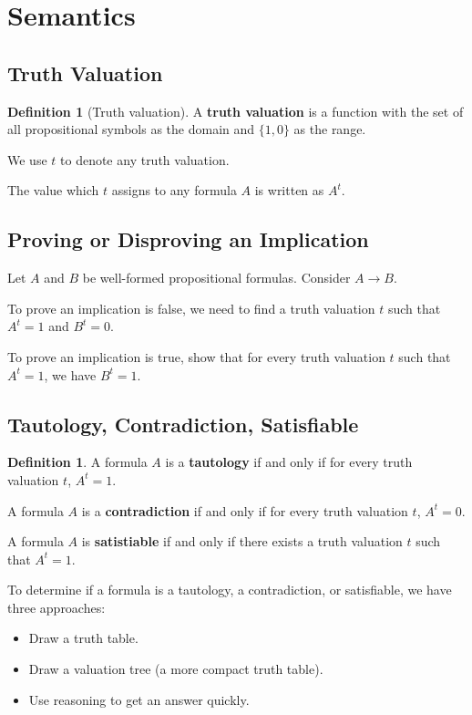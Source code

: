 \documentclass[11pt]{article}
\theoremstyle{definition}
\newtheorem{defn}[thm]{Definition}
\begin{document}
\newpage
\section{Semantics}

\subsection{Truth Valuation}

\begin{defn}[Truth valuation]
A {\bf truth valuation} is a function with the set of all propositional symbols as the domain and $\{1, 0\}$ as the range.

We use $t$ to denote any truth valuation.

The value which $t$ assigns to any formula $A$ is written as $A^t$.
\end{defn}

\subsection{Proving or Disproving an Implication}
Let $A$ and $B$ be well-formed propositional formulas. Consider $A \rightarrow B$. 

To prove an implication is false, we need to find a truth valuation $t$ such that $A^t = 1$ and $B^t = 0$.

To prove an implication is true, show that for every truth valuation $t$ such that $A^t = 1$, we have $B^t = 1$. 

\subsection{Tautology, Contradiction, Satisfiable}

\begin{defn}
A formula $A$ is a {\bf tautology} if and only if for every truth valuation $t$, $A^t = 1$.

A formula $A$ is a {\bf contradiction} if and only if for every truth valuation $t$, $A^t = 0$.

A formula $A$ is {\bf satistiable} if and only if there exists a truth valuation $t$ such that $A^t = 1$.
\end{defn}

To determine if a formula is a tautology, a contradiction, or satisfiable, we have three approaches: \vspace{-0.25cm}
\begin{itemize}
    \item Draw a truth table.
    \item Draw a valuation tree (a more compact truth table).
    \item Use reasoning to get an answer quickly.
\end{itemize}
\vspace{-0.25cm}
\end{document}

